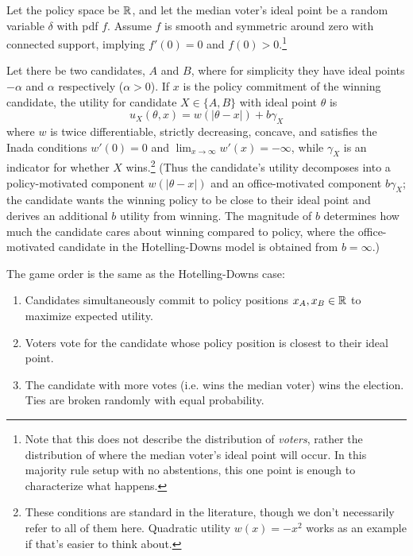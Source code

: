 \documentclass[../../../main.tex]{subfiles}
\begin{document}
\begin{definition}
    Let the policy space be $\mathbb{R}$, and let the median voter's ideal point be a random variable $\delta$
    with pdf $f$. Assume $f$ is smooth and symmetric around zero with connected support, implying $f'(0)=0$ and $f(0)>0$.\footnote{Note that this does not describe the distribution of \textit{voters}, rather the distribution of where the median voter's ideal point will occur. In this majority rule setup with no abstentions, this one point is enough to characterize what happens.}

    Let there be two candidates, $A$ and $B$, where for simplicity they have ideal points $-\alpha$ and $\alpha$ respectively ($\alpha>0$). 
    If $x$ is the policy commitment of the winning candidate, the utility for candidate $X\in\{A,B\}$ with ideal point $\theta$ is 
    \begin{equation*}
        u_X(\theta,x)=w(|\theta-x|)+b\gamma_X
    \end{equation*}
    where $w$ is twice differentiable, strictly decreasing, concave, and satisfies the Inada conditions $w'(0)=0$ and $\lim_{x\rightarrow\infty}w'(x)=-\infty$, while $\gamma_X$ is an indicator for whether $X$ wins.\footnote{These conditions are standard in the literature, though we don't necessarily refer to all of them here. Quadratic utility $w(x)=-x^2$ works as an example if that's easier to think about.}
    (Thus the candidate's utility decomposes into a policy-motivated component $w(|\theta-x|)$ and an office-motivated component $b\gamma_X$; the candidate wants the winning policy to be close to their ideal point and derives an additional $b$ utility from winning. 
    The magnitude of $b$ determines how much the candidate cares about winning compared to policy, where the office-motivated candidate in the Hotelling-Downs model is obtained from $b=\infty$.)

    The game order is the same as the Hotelling-Downs case:
    \begin{enumerate}
        \item Candidates simultaneously commit to policy positions $x_A,x_B\in\mathbb{R}$ to maximize expected utility.
        \item Voters vote for the candidate whose policy position is closest to their ideal point.
        \item The candidate with more votes (i.e. wins the median voter) wins the election. 
        Ties are broken randomly with equal probability.
    \end{enumerate}


\end{definition}
\end{document}
